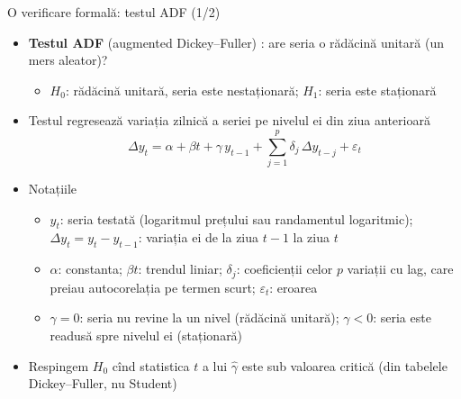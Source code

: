 \begin{frame}{O verificare formală: testul ADF (1/2)}
\itemsize{\small}
\begin{itemize}
    \item \textbf{Testul ADF} (augmented Dickey--Fuller) : are seria o rădăcină unitară (un mers aleator)?
    \begin{itemize}
        \item $H_0$: rădăcină unitară, seria este nestaționară; $H_1$: seria este staționară
    \end{itemize}
    \item Testul regresează variația zilnică a seriei pe nivelul ei din ziua anterioară \[ \Delta y_t = \alpha + \beta t + \gamma\, y_{t-1} + \sum_{j=1}^{p} \delta_j\, \Delta y_{t-j} + \varepsilon_t \]
    \item Notațiile
    \begin{itemize}
        \item $y_t$: seria testată (logaritmul prețului sau randamentul logaritmic); $\Delta y_t = y_t - y_{t-1}$: variația ei de la ziua $t-1$ la ziua $t$
        \item $\alpha$: constanta; $\beta t$: trendul liniar; $\delta_j$: coeficienții celor $p$ variații cu lag, care preiau autocorelația pe termen scurt; $\varepsilon_t$: eroarea
        \item $\gamma = 0$: seria nu revine la un nivel (rădăcină unitară); $\gamma < 0$: seria este readusă spre nivelul ei (staționară)
    \end{itemize}
    \item Respingem $H_0$ cînd statistica $t$ a lui $\hat\gamma$ este sub valoarea critică (din tabelele Dickey--Fuller, nu Student)
\end{itemize}
\end{frame}

